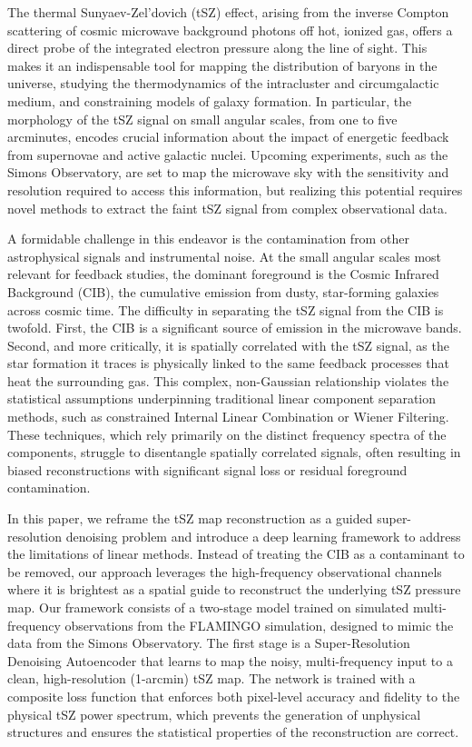 \documentclass[]{article}
\begin{document}
The thermal Sunyaev-Zel'dovich (tSZ) effect, arising from the inverse Compton scattering of cosmic microwave background photons off hot, ionized gas, offers a direct probe of the integrated electron pressure along the line of sight. This makes it an indispensable tool for mapping the distribution of baryons in the universe, studying the thermodynamics of the intracluster and circumgalactic medium, and constraining models of galaxy formation. In particular, the morphology of the tSZ signal on small angular scales, from one to five arcminutes, encodes crucial information about the impact of energetic feedback from supernovae and active galactic nuclei. Upcoming experiments, such as the Simons Observatory, are set to map the microwave sky with the sensitivity and resolution required to access this information, but realizing this potential requires novel methods to extract the faint tSZ signal from complex observational data.

A formidable challenge in this endeavor is the contamination from other astrophysical signals and instrumental noise. At the small angular scales most relevant for feedback studies, the dominant foreground is the Cosmic Infrared Background (CIB), the cumulative emission from dusty, star-forming galaxies across cosmic time. The difficulty in separating the tSZ signal from the CIB is twofold. First, the CIB is a significant source of emission in the microwave bands. Second, and more critically, it is spatially correlated with the tSZ signal, as the star formation it traces is physically linked to the same feedback processes that heat the surrounding gas. This complex, non-Gaussian relationship violates the statistical assumptions underpinning traditional linear component separation methods, such as constrained Internal Linear Combination or Wiener Filtering. These techniques, which rely primarily on the distinct frequency spectra of the components, struggle to disentangle spatially correlated signals, often resulting in biased reconstructions with significant signal loss or residual foreground contamination.

In this paper, we reframe the tSZ map reconstruction as a guided super-resolution denoising problem and introduce a deep learning framework to address the limitations of linear methods. Instead of treating the CIB as a contaminant to be removed, our approach leverages the high-frequency observational channels where it is brightest as a spatial guide to reconstruct the underlying tSZ pressure map. Our framework consists of a two-stage model trained on simulated multi-frequency observations from the FLAMINGO simulation, designed to mimic the data from the Simons Observatory. The first stage is a Super-Resolution Denoising Autoencoder that learns to map the noisy, multi-frequency input to a clean, high-resolution (1-arcmin) tSZ map. The network is trained with a composite loss function that enforces both pixel-level accuracy and fidelity to the physical tSZ power spectrum, which prevents the generation of unphysical structures and ensures the statistical properties of the reconstruction are correct.
\end{document}
